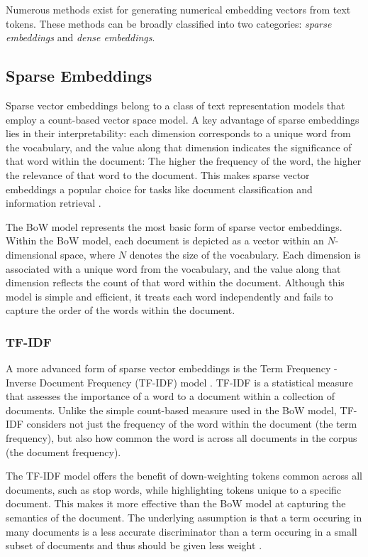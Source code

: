 Numerous methods exist for generating numerical embedding vectors from text tokens. These methods can be broadly classified into two categories: \emph{sparse embeddings} and \emph{dense embeddings}.

\subsection{Sparse Embeddings} \label{sec:sparse-embeddings}

Sparse vector embeddings belong to a class of text representation models that employ a count-based vector space model. A key advantage of sparse embeddings lies in their interpretability: each dimension corresponds to a unique word from the vocabulary, and the value along that dimension indicates the significance of that word within the document: The higher the frequency of the word, the higher the relevance of that word to the document. This makes sparse vector embeddings a popular choice for tasks like document classification and information retrieval \cite{ManningIntroductionInformation2008,JurafskySpeechLanguage2022}.

The \ac{BoW} model represents the most basic form of sparse vector embeddings. Within the \ac{BoW} model, each document is depicted as a vector within an $N$-dimensional space, where $N$ denotes the size of the vocabulary. Each dimension is associated with a unique word from the vocabulary, and the value along that dimension reflects the count of that word within the document. Although this model is simple and efficient, it treats each word independently and fails to capture the order of the words within the document.

\subsubsection*{TF-IDF}

A more advanced form of sparse vector embeddings is the Term Frequency - Inverse Document Frequency (TF-IDF) model \cite{SaltonTermWeighting1987}. TF-IDF is a statistical measure that assesses the importance of a word to a document within a collection of documents. Unlike the simple count-based measure used in the \ac{BoW} model, TF-IDF considers not just the frequency of the word within the document (the term frequency), but also how common the word is across all documents in the corpus (the document frequency).

The TF-IDF model offers the benefit of down-weighting tokens common across all documents, such as stop words, while highlighting tokens unique to a specific document. This makes it more effective than the \ac{BoW} model at capturing the semantics of the document. The underlying assumption is that a term occuring in many documents is a less accurate discriminator than a term occuring in a small subset of documents and thus should be given less weight \cite{BreitingerAcademicLiterature2023}.

